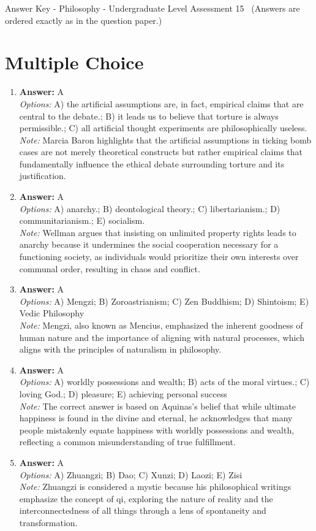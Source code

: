 \documentclass[12pt]{article}
\begin{document}
\begin{center}
Answer Key - Philosophy - Undergraduate Level Assessment 15 \
\small (Answers are ordered exactly as in the question paper.)
\end{center}

\section*{Multiple Choice}
\begin{enumerate}[label=\arabic*.]
\item \textbf{Answer:} A
\\ \textit{Options:} A) the artificial assumptions are, in fact, empirical claims that are central to the debate.; B) it leads us to believe that torture is always permissible.; C) all artificial thought experiments are philosophically useless.
\\ \textit{Note:} Marcia Baron highlights that the artificial assumptions in ticking bomb cases are not merely theoretical constructs but rather empirical claims that fundamentally influence the ethical debate surrounding torture and its justification.
\item \textbf{Answer:} A
\\ \textit{Options:} A) anarchy.; B) deontological theory.; C) libertarianism.; D) communitarianism.; E) socialism.
\\ \textit{Note:} Wellman argues that insisting on unlimited property rights leads to anarchy because it undermines the social cooperation necessary for a functioning society, as individuals would prioritize their own interests over communal order, resulting in chaos and conflict.
\item \textbf{Answer:} A
\\ \textit{Options:} A) Mengzi; B) Zoroastrianism; C) Zen Buddhism; D) Shintoism; E) Vedic Philosophy
\\ \textit{Note:} Mengzi, also known as Mencius, emphasized the inherent goodness of human nature and the importance of aligning with natural processes, which aligns with the principles of naturalism in philosophy.
\item \textbf{Answer:} A
\\ \textit{Options:} A) worldly possessions and wealth; B) acts of the moral virtues.; C) loving God.; D) pleasure; E) achieving personal success
\\ \textit{Note:} The correct answer is based on Aquinas's belief that while ultimate happiness is found in the divine and eternal, he acknowledges that many people mistakenly equate happiness with worldly possessions and wealth, reflecting a common misunderstanding of true fulfillment.
\item \textbf{Answer:} A
\\ \textit{Options:} A) Zhuangzi; B) Dao; C) Xunzi; D) Laozi; E) Zisi
\\ \textit{Note:} Zhuangzi is considered a mystic because his philosophical writings emphasize the concept of qi, exploring the nature of reality and the interconnectedness of all things through a lens of spontaneity and transformation.
\end{enumerate}
\end{document}
